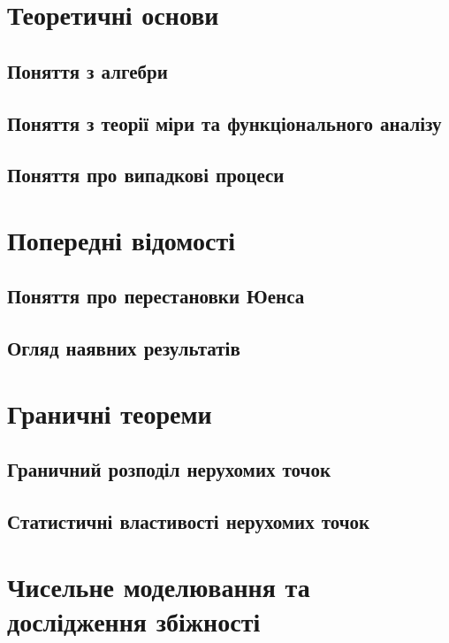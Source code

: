 





\tableofcontents
{}
    
\chapter{Теоретичні основи}
    \section{Поняття з алгебри}
        
    \section{Поняття з теорії міри та функціонального аналізу}
        
    \section{Поняття про випадкові процеси}
        
\chapter{Попередні відомості}
    \section{Поняття про перестановки Юенса}
    \section{Огляд наявних результатів}
\chapter{Граничні теореми}
    \section{Граничний розподіл нерухомих точок}
        
    \section{Статистичні властивості нерухомих точок}
        
\chapter{Чисельне моделювання та дослідження збіжності}
